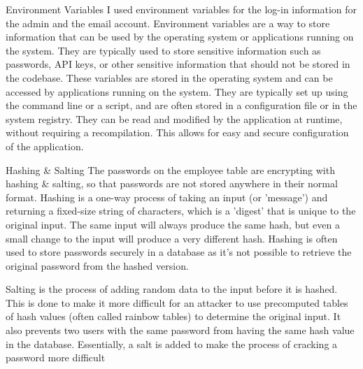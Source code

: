 \documentclass[aspectratio=169,xcolor=dvipsnames]{beamer}
\begin{document}
	\begin{frame}{Environment Variables}
		I used environment variables for the log-in information for the admin and the email account. Environment variables are a way to store information that can be used by the operating system or applications running on the system. They are typically used to store sensitive information such as passwords, API keys, or other sensitive information that should not be stored in the codebase. These variables are stored in the operating system and can be accessed by applications running on the system. They are typically set up using the command line or a script, and are often stored in a configuration file or in the system registry. They can be read and modified by the application at runtime, without requiring a recompilation. This allows for easy and secure configuration of the application.
	\end{frame}
	
	\begin{frame}{Hashing & Salting}
		The passwords on the employee table are encrypting with hashing & salting, so that passwords are not stored anywhere in their normal format. Hashing is a one-way process of taking an input (or 'message') and returning a fixed-size string of characters, which is a 'digest' that is unique to the original input. The same input will always produce the same hash, but even a small change to the input will produce a very different hash. Hashing is often used to store passwords securely in a database as it's not possible to retrieve the original password from the hashed version.
		
		Salting is the process of adding random data to the input before it is hashed. This is done to make it more difficult for an attacker to use precomputed tables of hash values (often called rainbow tables) to determine the original input. It also prevents two users with the same password from having the same hash value in the database. Essentially, a salt is added to make the process of cracking a password more difficult
	\end{frame}
	
\end{document}
